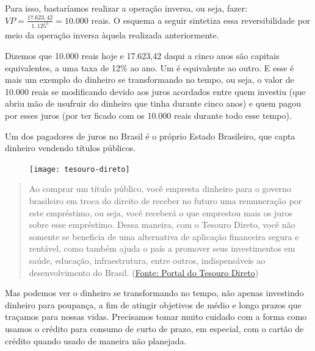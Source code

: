 Para isso, bastaríamos realizar a operação inversa, ou seja, fazer: ${\displaystyle VP = \frac{ 17.623,42}{ 1,125^5} = 10.000}${} reais. O esquema a seguir sintetiza essa reversibilidade por meio da operação inversa àquela realizada anteriormente.


\begin{figure}[H]
\centering


\end{figure}

Dizemos que 10.000 reais hoje e 17.623,42 daqui a cinco anos são capitais equivalentes, a uma taxa de 12\% ao ano. Um é equivalente ao outro. E esse é mais um exemplo do dinheiro se transformando no tempo, ou seja, o valor de 10.000 reais se modificando devido aos juros acordados entre quem investiu (que abriu mão de usufruir do dinheiro que tinha durante cinco anos) e quem pagou por esses juros (por ter ficado com os 10.000 reais durante todo esse tempo). 

Um dos pagadores de juros no Brasil é o próprio Estado Brasileiro, que capta dinheiro vendendo títulos públicos.

\begin{figure}[H]

\centering
\texttt{[image: tesouro-direto]}
\end{figure}
\vspace{-1em}
\begin{quote}
Ao comprar um título público, você empresta dinheiro para o governo brasileiro em troca do direito de receber no futuro uma remuneração por este empréstimo, ou seja, você receberá o que emprestou mais os juros sobre esse empréstimo. Dessa maneira, com o Tesouro Direto, você não somente se beneficia de uma alternativa de aplicação financeira segura e rentável, como também ajuda o país a promover seus investimentos em saúde, educação, infraestrutura, entre outros, indispensáveis ao desenvolvimento do Brasil. 
\flushright(\href{http://www.tesouro.gov.br/web/stn/-/conheca-o-tesouro-direto}{Fonte: Portal do Tesouro Direto})
\end{quote}
Mas podemos ver o dinheiro se transformando no tempo, não apenas investindo dinheiro para poupança, a fim de atingir objetivos de médio e longo prazos que traçamos para nossas vidas. Precisamos tomar muito cuidado com a forma como usamos o crédito para consumo de curto de prazo, em especial, com o cartão de crédito quando usado de maneira não planejada. 

